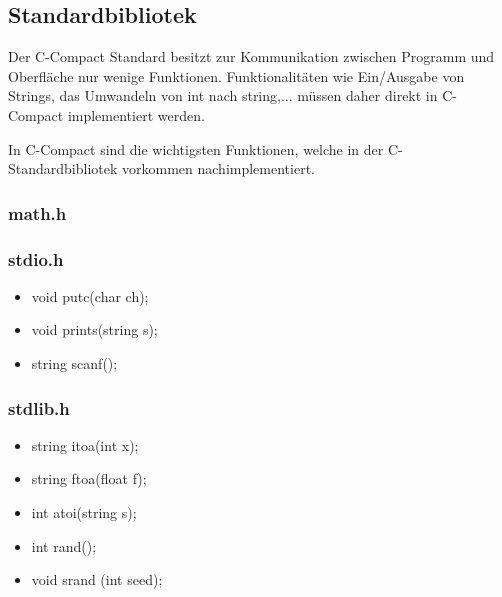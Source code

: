 
\subsection{Standardbibliotek}

Der C-Compact Standard besitzt zur Kommunikation zwischen Programm und Oberfläche nur wenige Funktionen. Funktionalitäten wie Ein/Ausgabe von Strings, das Umwandeln von int nach string,... müssen daher direkt in C-Compact implementiert werden.

In C-Compact sind die wichtigsten Funktionen, welche in der C-Standardbibliotek vorkommen nachimplementiert.

\subsubsection{math.h}

\subsubsection{stdio.h}

\begin{itemize}
  \item void putc(char ch);
  \item void prints(string s);
  \item string scanf();
\end{itemize}

\subsubsection{stdlib.h}

\begin{itemize}
  \item string itoa(int x);
  \item string ftoa(float f);
  \item int atoi(string s);
  \item int rand();
  \item void srand (int seed);
\end{itemize}


